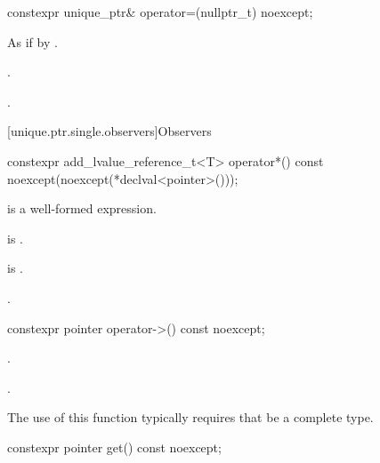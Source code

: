 %
\begin{itemdecl}
constexpr unique_ptr& operator=(nullptr_t) noexcept;
\end{itemdecl}

\begin{itemdescr}
\pnum
\effects
As if by .

\pnum
\ensures
{}.

\pnum
\returns
{}.
\end{itemdescr}

[unique.ptr.single.observers]{Observers}

%
\begin{itemdecl}
constexpr add_lvalue_reference_t<T> operator*() const noexcept(noexcept(*declval<pointer>()));
\end{itemdecl}

\begin{itemdescr}
\pnum
\constraints
{} is a well-formed expression.

\pnum
\mandates
{} is .

\pnum
\expects
{} is .

\pnum
\returns
{}.

\end{itemdescr}

%
\begin{itemdecl}
constexpr pointer operator->() const noexcept;
\end{itemdecl}

\begin{itemdescr}
\pnum
\expects
{}.

\pnum
\returns
{}.

\pnum
\begin{note}
The use of this function typically requires that  be a complete type.
\end{note}
\end{itemdescr}

%
\begin{itemdecl}
constexpr pointer get() const noexcept;
\end{itemdecl}

